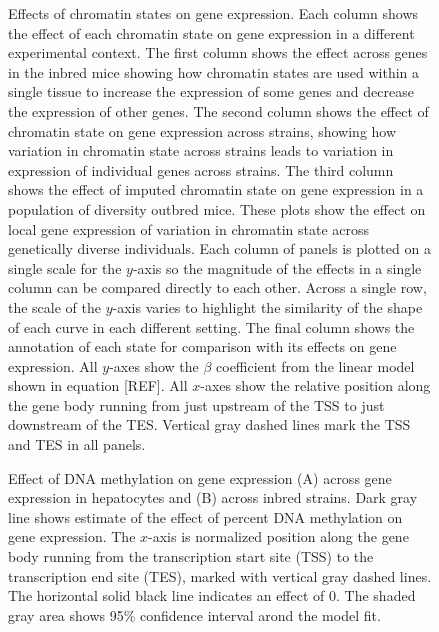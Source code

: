 \documentclass[10pt,letterpaper]{article}
\begin{document}
\begin{figure}[ht]
\centering
\caption{Effects of chromatin states on gene expression. Each column shows 
the effect of each chromatin state on gene expression in a different 
experimental context. The first column shows the effect across genes in 
the inbred mice showing how chromatin states are used within a single 
tissue to increase the expression of some genes and decrease the expression 
of other genes. The second column shows the effect of chromatin state on 
gene expression across strains, showing how variation in chromatin state 
across strains leads to variation in expression of individual genes across 
strains. The third column shows the effect of imputed chromatin state on 
gene expression in a population of diversity outbred mice. These plots show 
the effect on local gene expression of variation in chromatin state across 
genetically diverse individuals. Each column of panels is plotted on a single 
scale for the $y$-axis so the magnitude of the effects in a single column can be 
compared directly to each other. Across a single row, the scale of the $y$-axis 
varies to highlight the similarity of the shape of each curve in each different 
setting. The final column shows the annotation of each state for comparison with
its effects on gene expression. All $y$-axes show the $\beta$ coefficient from 
the linear model shown in equation [REF]. All $x$-axes show the relative 
position along the gene body running from just upstream of the TSS to just downstream 
of the TES. Vertical gray dashed lines mark the TSS and TES in all panels.}
\label{fig:state_effects}
\end{figure}

\begin{figure}[ht]
\centering
\caption{Effect of DNA methylation on gene expression (A) across gene expression
in hepatocytes and (B) across inbred strains. Dark gray line shows estimate
of the effect of percent DNA methylation on gene expression. The $x$-axis is
normalized position along the gene body running from the transcription start
site (TSS) to the transcription end site (TES), marked with vertical gray dashed
lines. The horizontal solid black line indicates an effect of 0. 
The shaded gray area shows 95\% confidence interval arond the model fit.}
\label{fig:DNA_methylation_effect}
\end{figure}
\end{document}

